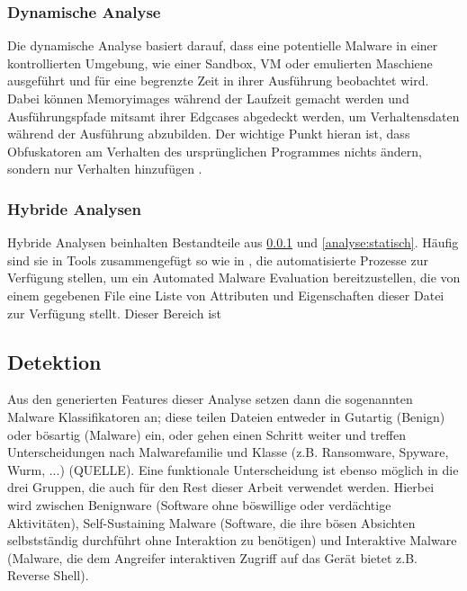 \subsubsection{Dynamische Analyse}
\label{analyse:dynamisch}
Die dynamische Analyse basiert darauf, dass eine potentielle Malware in einer kontrollierten Umgebung, wie einer Sandbox, VM oder emulierten Maschiene ausgeführt und für eine begrenzte Zeit in ihrer Ausführung beobachtet wird\cite{aboaoja_2023_a}. Dabei können Memoryimages während der Laufzeit gemacht werden und Ausführungspfade mitsamt ihrer Edgcases abgedeckt werden, um Verhaltensdaten während der Ausführung abzubilden. Der wichtige Punkt hieran ist, dass Obfuskatoren am Verhalten des ursprünglichen Programmes nichts ändern, sondern nur Verhalten hinzufügen \cite{alkhateeb_2023_a}. 

\subsubsection{Hybride Analysen}
\label{analyse:hybrid}
Hybride Analysen beinhalten Bestandteile aus \ref{analyse:dynamisch} und \ref{analyse:statisch}. Häufig sind sie in Tools zusammengefügt so wie in \cite{CAPE2}, die automatisierte Prozesse zur Verfügung stellen, um ein Automated Malware Evaluation bereitzustellen, die von einem gegebenen File eine Liste von Attributen und Eigenschaften dieser Datei zur Verfügung stellt. Dieser Bereich ist 

\subsection{Detektion}
Aus den generierten Features dieser Analyse setzen dann die sogenannten Malware Klassifikatoren an; diese teilen Dateien entweder in Gutartig (Benign) oder bösartig (Malware) ein, oder gehen einen Schritt weiter und treffen Unterscheidungen nach Malwarefamilie und Klasse (z.B. Ransomware, Spyware, Wurm, ...) (QUELLE). Eine funktionale Unterscheidung ist ebenso möglich in die drei Gruppen, die auch für den Rest dieser Arbeit verwendet werden. Hierbei wird zwischen Benignware (Software ohne böswillige oder verdächtige Aktivitäten), Self-Sustaining Malware (Software, die ihre bösen Absichten selbstständig durchführt ohne Interaktion zu benötigen) und Interaktive Malware (Malware, die dem Angreifer interaktiven Zugriff auf das Gerät bietet z.B. Reverse Shell).

